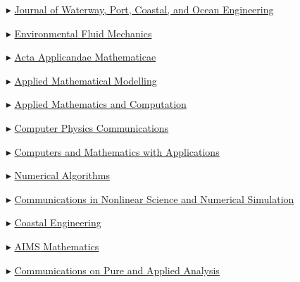 \begin{itemize}
    \item[$\blacktriangleright$] \href{http://ascelibrary.org/wwo/}%
    {Journal of Waterway, Port, Coastal, and Ocean Engineering}

    \item[$\blacktriangleright$] \href{https://link.springer.com/journal/10652/}%
    {Environmental Fluid Mechanics}

    \item[$\blacktriangleright$] \href{https://link.springer.com/journal/10440/}%
    {Acta Applicandae Mathematicae}
    
    \item[$\blacktriangleright$] \href{http://www.journals.elsevier.com/applied-mathematical-modelling/}%
    {Applied Mathematical Modelling}
    
    \item[$\blacktriangleright$] \href{http://www.journals.elsevier.com/applied-mathematics-and-computation/}%
    {Applied Mathematics and Computation}
    
    \item[$\blacktriangleright$] \href{https://www.journals.elsevier.com/computer-physics-communications}{Computer Physics Communications}
    
    \item[$\blacktriangleright$] \href{http://www.journals.elsevier.com/computers-and-mathematics-with-applications/}%
    {Computers and Mathematics with Applications}
    
    \item[$\blacktriangleright$] \href{http://www.springerlink.com/content/101751/}{Numerical Algorithms}
    
    \item[$\blacktriangleright$] \href{http://www.journals.elsevier.com/communications-in-nonlinear-science-and-numerical-simulation}%
    {Communications in Nonlinear Science and Numerical Simulation}

    \item[$\blacktriangleright$] \href{https://www.sciencedirect.com/journal/coastal-engineering/}{Coastal Engineering}

    \item[$\blacktriangleright$] \href{https://www.aimspress.com/journal/Math/}{AIMS Mathematics}
   
    \item[$\blacktriangleright$] \href{http://aimsciences.org/journals/cpaa/}%
    {Communications on Pure and Applied Analysis}


\end{itemize}
